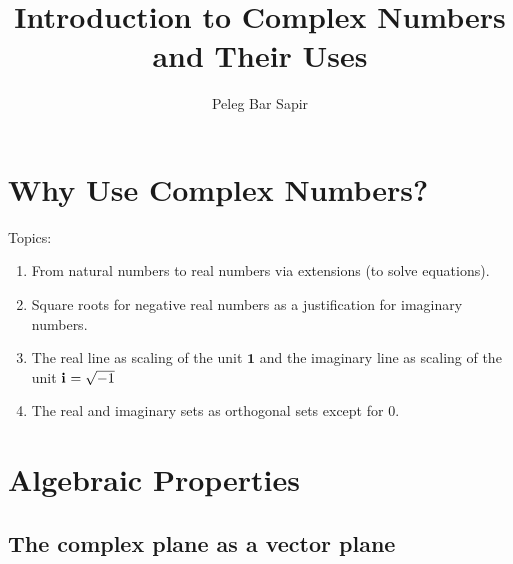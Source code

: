 \documentclass{article}
\title{Introduction to Complex Numbers and Their Uses}
\author{Peleg Bar Sapir}
\newcommand{\iu}{\mathbf{i}\mkern1mu}
\begin{document}
\maketitle

\section{Why Use Complex Numbers?}
Topics:
\begin{enumerate}
	\item From natural numbers to real numbers via extensions (to solve equations).
	\item Square roots for negative real numbers as a justification for imaginary numbers.
	\item The real line as scaling of the unit $\mathbf{1}$ and the imaginary line as scaling of the unit $\iu=\sqrt{-1}$
	\item The real and imaginary sets as orthogonal sets except for $0$.
\end{enumerate}

\section{Algebraic Properties}
\subsection{The complex plane as a vector plane}
\end{document}
